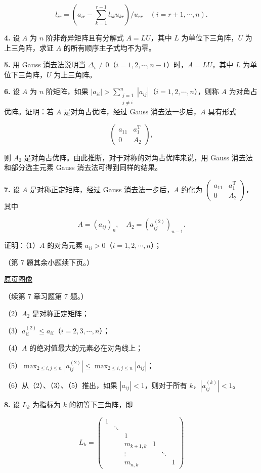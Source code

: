 \documentclass[
  10pt,
  fontset=fandol]{ctexart}
\begin{document}
\[
l_{ir}=\left(a_{ir}-\sum_{k=1}^{r-1}l_{ik}u_{kr}\right)/u_{rr}\quad(i=r+1,\cdots,n).
\]

\textbf{4.} 设 \(A\) 为 \(n\) 阶非奇异矩阵且有分解式 \(A=LU\)，其中 \(L\) 为单位下三角阵，\(U\) 为上三角阵，求证 \(A\) 的所有顺序主子式均不为零。

\textbf{5.} 用 Gauss 消去法说明当 \(\Delta_i\neq0\)（\(i=1,2,\cdots,n-1\)）时，\(A=LU\)，其中 \(L\) 为单位下三角阵，\(U\) 为上三角阵。

\textbf{6.} 设 \(A\) 为 \(n\) 阶矩阵，如果 \(|a_{ii}|>\sum_{\substack{j=1\\j\neq i}}^{n}|a_{ij}|\)（\(i=1,2,\cdots,n\)），则称 \(A\) 为对角占优阵。证明：若 \(A\) 是对角占优阵，经过 Gauss 消去法一步后，\(A\) 具有形式

\[
\begin{pmatrix}a_{11}&a_1^{\mathrm T}\\0&A_2\end{pmatrix},
\]

则 \(A_2\) 是对角占优阵。由此推断，对于对称的对角占优阵来说，用 Gauss 消去法和部分选主元素 Gauss 消去法可得到同样的结果。

\textbf{7.} 设 \(A\) 是对称正定矩阵，经过 Gauss 消去法一步后，\(A\) 约化为 \(\begin{pmatrix}a_{11}&a_1^{\mathrm T}\\0&A_2\end{pmatrix}\)，其中

\[
A=(a_{ij})_n,\quad A_2=(a_{ij}^{(2)})_{n-1}.
\]

证明：（1）\(A\) 的对角元素 \(a_{ii}>0\)（\(i=1,2,\cdots,n\)）；

（第 7 题其余小题续下页。）

\href{../../source-images/pdf-213.jpeg}{原页图像}

（续第 7 章习题第 7 题。）

（2）\(A_2\) 是对称正定矩阵；

（3）\(a_{ii}^{(2)}\leqslant a_{ii}\)（\(i=2,3,\cdots,n\)）；

（4）\(A\) 的绝对值最大的元素必在对角线上；

（5）\(\max_{2\leqslant i,\allowbreak j\leqslant n}|a_{ij}^{(2)}|\leqslant\max_{2\leqslant i,\allowbreak j\leqslant n}|a_{ij}|\)；

（6）从（2）、（3）、（5）推出，如果 \(|a_{ij}|<1\)，则对于所有 \(k\)，\(|a_{ij}^{(k)}|<1\)。

\textbf{8.} 设 \(L_k\) 为指标为 \(k\) 的初等下三角阵，即

\[
L_k=\begin{pmatrix}
1&&&&&\\
&\ddots&&&&\\
&&1&&&\\
&&m_{k+1,k}&1&&\\
&&\vdots&&\ddots&\\
&&m_{n,k}&&&1
\end{pmatrix}
\]
\end{document}
